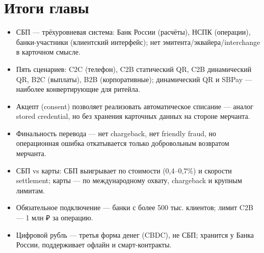 \section*{Итоги главы}

\begin{itemize}
  \item СБП — трёхуровневая система: Банк России (расчёты),
        НСПК (операции), банки-участники (клиентский интерфейс);
        нет эмитента/эквайера/interchange в карточном смысле.
  \item Пять сценариев: C2C (телефон), C2B статический QR, C2B
        динамический QR, B2C (выплаты), B2B (корпоративные);
        динамический QR и SBPay — наиболее конвертирующие для ритейла.
  \item Акцепт (consent) позволяет реализовать автоматическое
        списание — аналог stored credential, но без хранения
        карточных данных на стороне мерчанта.
  \item Финальность перевода — нет chargeback, нет friendly fraud,
        но операционная ошибка откатывается только добровольным
        возвратом мерчанта.
  \item СБП vs карты: СБП выигрывает по стоимости (0,4--0,7\%)
        и скорости settlement; карты — по международному охвату,
        chargeback и крупным лимитам.
  \item Обязательное подключение — банки с более 500 тыс. клиентов;
        лимит C2B — 1 млн ₽ за операцию.
  \item Цифровой рубль — третья форма денег (CBDC), не СБП;
        хранится у Банка России, поддерживает офлайн и смарт-контракты.
\end{itemize}
